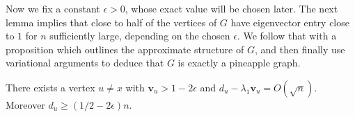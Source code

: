 Now we fix a constant $\epsilon > 0$, whose exact value will be 
chosen later.  The next lemma implies that close to half of the vertices of
$G$ have eigenvector entry close to $1$ for $n$ sufficiently large, 
depending on the chosen $\epsilon$.  We follow that with a proposition
which outlines the approximate structure of $G$, and then finally use
variational arguments to deduce that $G$ is exactly a pineapple graph.


\begin{lemma}\label{u good}
 There exists a vertex $u\not=x$ with $\mathbf{v}_u > 1- 2 \epsilon$ and $d_u - \lambda_1 \mathbf{v}_u = O(\sqrt{n})$.  Moreover $d_u \geq \left( 1/2 - 2\epsilon \right)n$.
\end{lemma}



